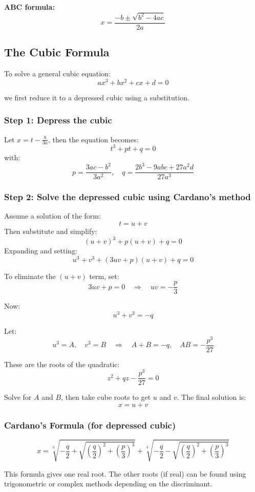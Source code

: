 \textbf{ABC formula:}
\[
x = \frac{-b \pm \sqrt{b^2 - 4ac}}{2a}
\]

\subsection{The Cubic Formula}

To solve a general cubic equation:
\[
ax^3 + bx^2 + cx + d = 0
\]

we first reduce it to a depressed cubic using a substitution.

\subsubsection*{Step 1: Depress the cubic}

Let \(x = t - \frac{b}{3a}\), then the equation becomes:
\[
t^3 + pt + q = 0
\]
with:
\[
p = \frac{3ac - b^2}{3a^2}, \quad q = \frac{2b^3 - 9abc + 27a^2d}{27a^3}
\]

\subsubsection*{Step 2: Solve the depressed cubic using Cardano’s method}

Assume a solution of the form:
\[
t = u + v
\]
Then substitute and simplify:
\[
(u+v)^3 + p(u+v) + q = 0
\]
Expanding and setting:
\[
u^3 + v^3 + (3uv + p)(u+v) + q = 0
\]

To eliminate the \((u+v)\) term, set:
\[
3uv + p = 0 \quad \Rightarrow \quad uv = -\frac{p}{3}
\]

Now:
\[
u^3 + v^3 = -q
\]

Let:
\[
u^3 = A, \quad v^3 = B \quad \Rightarrow \quad A + B = -q, \quad AB = -\frac{p^3}{27}
\]

These are the roots of the quadratic:
\[
z^2 + qz - \frac{p^3}{27} = 0
\]

Solve for \(A\) and \(B\), then take cube roots to get \(u\) and \(v\). The final solution is:
\[
x = u + v
\]

\subsubsection*{Cardano’s Formula (for depressed cubic)}
\[
x = \sqrt[3]{-\frac{q}{2} + \sqrt{\left(\frac{q}{2}\right)^2 + \left(\frac{p}{3}\right)^3}} + \sqrt[3]{-\frac{q}{2} - \sqrt{\left(\frac{q}{2}\right)^2 + \left(\frac{p}{3}\right)^3}}
\]

This formula gives one real root. The other roots (if real) can be found using trigonometric or complex methods depending on the discriminant.

\newpage
